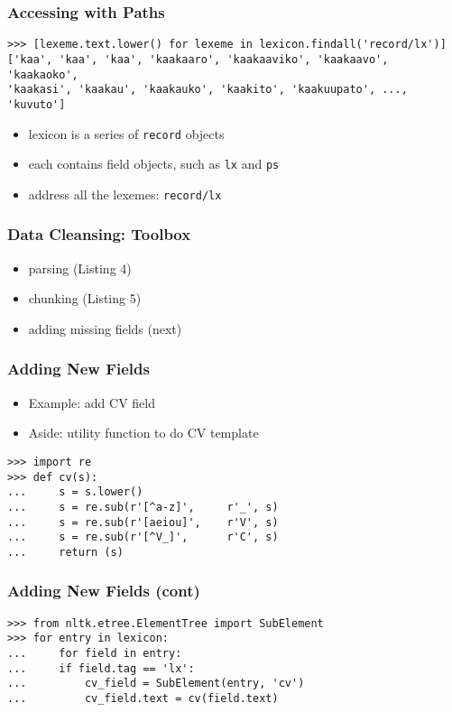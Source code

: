 \documentclass{beamer}             %
\begin{document}
\begin{frame}[fragile]
\frametitle{Accessing with Paths}

\scriptsize
\begin{verbatim}
>>> [lexeme.text.lower() for lexeme in lexicon.findall('record/lx')]
['kaa', 'kaa', 'kaa', 'kaakaaro', 'kaakaaviko', 'kaakaavo', 'kaakaoko',
'kaakasi', 'kaakau', 'kaakauko', 'kaakito', 'kaakuupato', ..., 'kuvuto']
\end{verbatim}

\small
\begin{itemize}
\item lexicon is a series of \texttt{record} objects
\item each contains field objects, such as \texttt{lx} and \texttt{ps}
\item address all the lexemes: \texttt{record/lx}
\end{itemize}

\end{frame}

\begin{frame}
\frametitle{Data Cleansing: Toolbox}

\begin{itemize}
\item parsing (Listing 4)
\item chunking (Listing 5)
\item adding missing fields (next)
\end{itemize}
\end{frame}

\begin{frame}[fragile]
\frametitle{Adding New Fields}
\small

\begin{itemize}
\item Example: add CV field
\item Aside: utility function to do CV template
\end{itemize}

\begin{verbatim}
>>> import re
>>> def cv(s):
...     s = s.lower()
...     s = re.sub(r'[^a-z]',     r'_', s)
...     s = re.sub(r'[aeiou]',    r'V', s)
...     s = re.sub(r'[^V_]',      r'C', s)
...     return (s)
\end{verbatim}
\end{frame}

\begin{frame}[fragile]
\frametitle{Adding New Fields (cont)}
\small

\begin{verbatim}
>>> from nltk.etree.ElementTree import SubElement
>>> for entry in lexicon:
...     for field in entry:
...	    if field.tag == 'lx':
...         cv_field = SubElement(entry, 'cv')
...         cv_field.text = cv(field.text)
\end{verbatim}
\end{frame}
\end{document}
